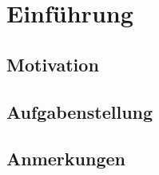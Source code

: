 \chapter{Einführung}

\section{Motivation}
\section{Aufgabenstellung}
\section{Anmerkungen}

\section{}